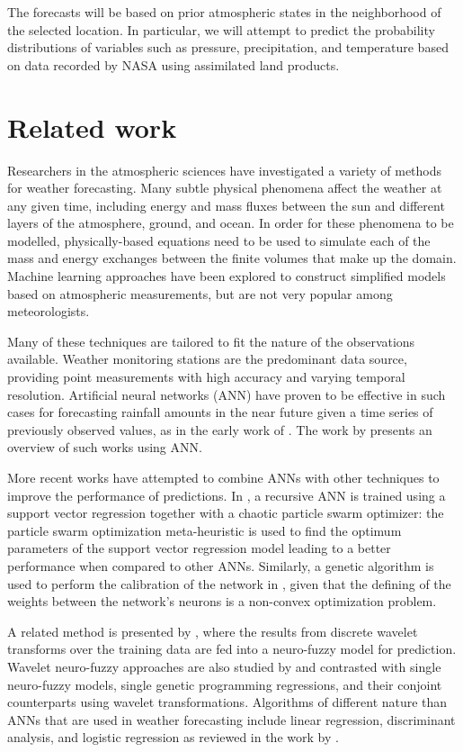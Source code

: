 \documentclass{article}
\begin{document}
The forecasts will be based on prior atmospheric states in the neighborhood of
the selected location. In particular, we will attempt to predict the probability
distributions of variables such as pressure, precipitation, and temperature
based on data recorded by NASA using assimilated land products.

\section{Related work} 
 
Researchers in the atmospheric sciences have investigated a variety of methods
for weather forecasting. Many subtle physical phenomena affect the weather at
any given time, including energy and mass fluxes between the sun and different
layers of the atmosphere, ground, and ocean. In order for these phenomena
to be modelled, physically-based equations need to be used to simulate each of
the mass and energy exchanges between the finite volumes that make up the
domain. Machine learning approaches have been explored to construct simplified
models based on atmospheric measurements, but are not very popular among
meteorologists.

Many of these techniques are tailored to fit the nature of the observations
available. Weather monitoring stations are the predominant data source,
providing point measurements with high accuracy and varying temporal resolution.
Artificial neural networks (ANN) have proven to be effective in such cases for
forecasting rainfall amounts in the near future given a time series of
previously observed values, as in the early work of \citet{French1992}. The work
by \citet{maier2000} presents an overview of such works using ANN.

More recent works have attempted to combine ANNs with other techniques to
improve the performance of predictions. In \cite{hong2008}, a recursive ANN is
trained using a support vector regression together with a chaotic particle swarm
optimizer: the particle swarm optimization meta-heuristic is used to find the
optimum parameters of the support vector regression model leading to a better
performance when compared to other ANNs. Similarly, a genetic algorithm is used
to perform the calibration of the network in \cite{nasseri2008}, given that the
defining of the weights between the network's neurons is a non-convex
optimization problem.

A related method is presented by \citet{Partal2007}, where
the results from discrete wavelet transforms over the training data are fed into
a neuro-fuzzy model for prediction. Wavelet neuro-fuzzy approaches are also
studied by \citet{Kisi2011} and contrasted with single neuro-fuzzy models,
single genetic programming regressions, and their conjoint counterparts using
wavelet transformations. Algorithms of different nature than ANNs that are used
in weather forecasting include linear regression, discriminant analysis, and
logistic regression as reviewed in the work by \citet{applequist2002}.
\end{document}
